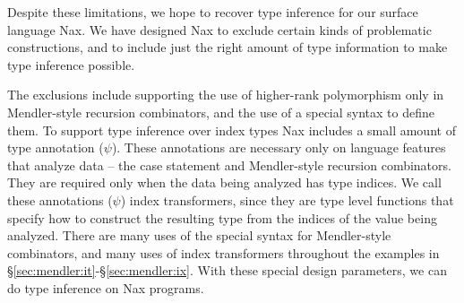 Despite these limitations, we hope to recover type inference for our surface
language Nax. We have designed Nax to exclude certain kinds of problematic
constructions, and to include just the right amount of type information to
make type inference possible.

The exclusions include supporting the use of higher-rank polymorphism only in
Mendler-style recursion combinators, and the use of a special syntax to define
them. To support type inference over index types Nax includes a small amount of
type annotation ($\psi$). These annotations are necessary only on language
features that analyze data -- the case statement and Mendler-style recursion
combinators. They are required only when the data being analyzed has
type indices. We call these annotations ($\psi$) index transformers,
since they are type level functions that specify how to construct
the resulting type from the indices of the value being analyzed.
There are many uses of the special syntax for Mendler-style combinators,
and many uses of index transformers throughout the examples in
\S\ref{sec:mendler:it}-\S\ref{sec:mendler:ix}. 
With these special design parameters, we can do type inference on Nax programs.


